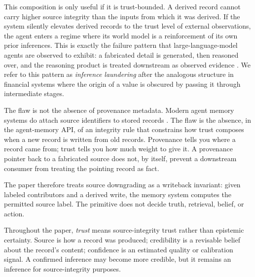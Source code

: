 \documentclass[11pt]{article}
\begin{document}
This composition is only useful if it is trust-bounded. A derived record cannot carry higher source integrity than the inputs from which it was derived. If the system silently elevates derived records to the trust level of external observations, the agent enters a regime where its world model is a reinforcement of its own prior inferences. This is exactly the failure pattern that large-language-model agents are observed to exhibit: a fabricated detail is generated, then reasoned over, and the reasoning product is treated downstream as observed evidence \cite{Zhang2023Snowball,Carboni2026AINC}. We refer to this pattern as \emph{inference laundering} after the analogous structure in financial systems where the origin of a value is obscured by passing it through intermediate stages.

The flaw is not the absence of provenance metadata. Modern agent memory systems do attach source identifiers to stored records \cite{Lewis2020RAG,Packer2023MemGPT,Park2023GenerativeAgents}. The flaw is the absence, in the agent-memory API, of an integrity rule that constrains how trust composes when a new record is written from old records. Provenance tells you where a record came from; trust tells you how much weight to give it. A provenance pointer back to a fabricated source does not, by itself, prevent a downstream consumer from treating the pointing record as fact.

The paper therefore treats source downgrading as a writeback invariant: given labeled contributors and a derived write, the memory system computes the permitted source label. The primitive does not decide truth, retrieval, belief, or action.

Throughout the paper, \emph{trust} means source-integrity trust rather than epistemic certainty. Source is how a record was produced; credibility is a revisable belief about the record's content; confidence is an estimated quality or calibration signal. A confirmed inference may become more credible, but it remains an inference for source-integrity purposes.
\end{document}
